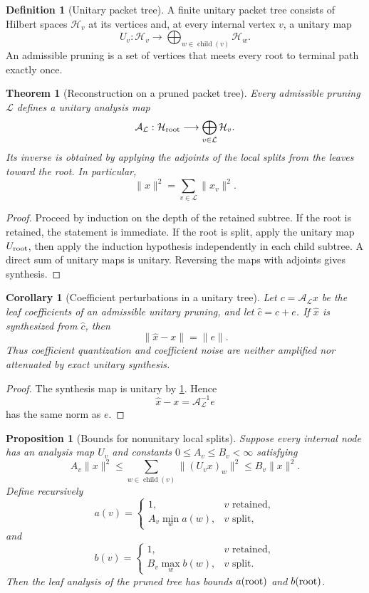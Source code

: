 \documentclass{aomart}
\newtheorem{theorem}{Theorem}[section]
\newtheorem{proposition}[proposition]{Proposition}
\newtheorem{corollary}[corollary]{Corollary}
\theoremstyle{definition}
\newtheorem{definition}[definition]{Definition}
\theoremstyle{remark}
\newcommand{\Acal}{\mathcal A}
\newcommand{\Hcal}{\mathcal H}
\newcommand{\Lcal}{\mathcal L}
\begin{document}
\begin{definition}[Unitary packet tree]\label{def:unitary_packet_tree}
A finite unitary packet tree consists of Hilbert spaces \(\Hcal_v\) at its vertices and, at every internal vertex \(v\), a unitary map
\[
U_v:\Hcal_v\longrightarrow\bigoplus_{w\in\operatorname{child}(v)}\Hcal_w.
\]
An admissible pruning is a set of vertices that meets every root to terminal path exactly once.
\end{definition}

\begin{theorem}[Reconstruction on a pruned packet tree]\label{thm:pruned_packet_tree}
Every admissible pruning \(\Lcal\) defines a unitary analysis map
\[
\Acal_{\Lcal}:\Hcal_{\rm root}
\longrightarrow
\bigoplus_{v\in\Lcal}\Hcal_v.
\]
Its inverse is obtained by applying the adjoints of the local splits from the leaves toward the root. In particular,
\[
\|x\|^2
=
\sum_{v\in\Lcal}\|x_v\|^2.
\]
\end{theorem}

\begin{proof}
Proceed by induction on the depth of the retained subtree. If the root is retained, the statement is immediate. If the root is split, apply the unitary map \(U_{\rm root}\), then apply the induction hypothesis independently in each child subtree. A direct sum of unitary maps is unitary. Reversing the maps with adjoints gives synthesis.
\end{proof}

\begin{corollary}[Coefficient perturbations in a unitary tree]\label{cor:unitary_tree_noise}
Let \(c=\Acal_{\Lcal}x\) be the leaf coefficients of an admissible unitary pruning, and let \(\widehat c=c+e\). If \(\widehat x\) is synthesized from \(\widehat c\), then
\[
\|\widehat x-x\|=\|e\|.
\]
Thus coefficient quantization and coefficient noise are neither amplified nor attenuated by exact unitary synthesis.
\end{corollary}

\begin{proof}
The synthesis map is unitary by \cref{thm:pruned_packet_tree}. Hence
\[
\widehat x-x
=\Acal_{\Lcal}^{-1}e
\]
has the same norm as \(e\).
\end{proof}

\begin{proposition}[Bounds for nonunitary local splits]\label{prop:nonunitary_tree_bounds}
Suppose every internal node has an analysis map \(U_v\) and constants \(0\leq A_v\leq B_v<\infty\) satisfying
\[
A_v\|x\|^2
\leq
\sum_{w\in\operatorname{child}(v)}\|(U_vx)_w\|^2
\leq
B_v\|x\|^2.
\]
Define recursively
\[
a(v)=
\begin{cases}
1,&v\text{ retained},\\
A_v\min_w a(w),&v\text{ split},
\end{cases}
\]
and
\[
b(v)=
\begin{cases}
1,&v\text{ retained},\\
B_v\max_w b(w),&v\text{ split}.
\end{cases}
\]
Then the leaf analysis of the pruned tree has bounds \(a({\rm root})\) and \(b({\rm root})\).
\end{proposition}
\end{document}
